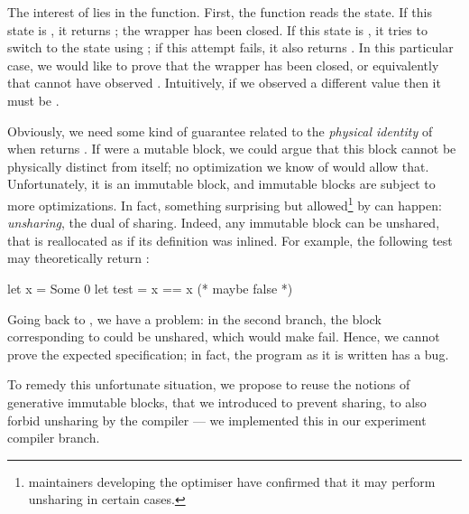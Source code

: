The interest of  lies in the  function.
First, the function reads the state.
If this state is , it returns ; the wrapper has been closed.
If this state is , it tries to switch to the  state using ; if this attempt fails, it also returns .
In this particular case, we would like to prove that the wrapper has been closed, or equivalently that  cannot have observed .
Intuitively, if we observed a different value then it must be .

Obviously, we need some kind of guarantee related to the \emph{physical identity} of  when  returns .
If  were a mutable block, we could argue that this block cannot be physically distinct from itself; no optimization we know of would allow that.
Unfortunately, it is an immutable block, and immutable blocks are subject to more optimizations.
In fact, something surprising but allowed\footnote{\OCaml maintainers developing the \Flambda optimiser have confirmed that it may perform unsharing in certain cases.} by \OCaml can happen: \emph{unsharing}, the dual of sharing.
Indeed, any immutable block can be unshared, that is reallocated as if its definition was inlined.
For example, the following test may theoretically return :
\begin{ocamlcode}
let x = Some 0
let test = x == x (* maybe false *)
\end{ocamlcode}

Going back to , we have a problem: in the second branch, the  block corresponding to  could be unshared, which would make  fail.
Hence, we cannot prove the expected specification; in fact, the program as it is written has a bug.

To remedy this unfortunate situation, we propose to reuse the notions of generative immutable blocks, that we introduced to prevent sharing, to also forbid unsharing by the \OCaml compiler --- we implemented this in our experiment compiler branch.


